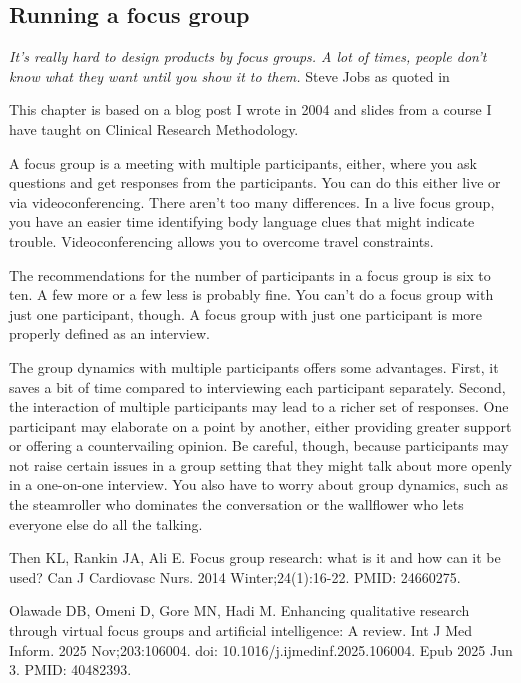 \documentclass[
  letterpaper,
  DIV=11,
  numbers=noendperiod]{scrreprt}
\begin{document}
\begin{tcolorbox}

\chapter{Running a focus group}\label{running-a-focus-group}

\emph{It's really hard to design products by focus groups. A lot of
times, people don't know what they want until you show it to them.}
Steve Jobs as quoted in

This chapter is based on a blog post I wrote in 2004 and slides from a
course I have taught on Clinical Research Methodology.

A focus group is a meeting with multiple participants, either, where you
ask questions and get responses from the participants. You can do this
either live or via videoconferencing. There aren't too many differences.
In a live focus group, you have an easier time identifying body language
clues that might indicate trouble. Videoconferencing allows you to
overcome travel constraints.

The recommendations for the number of participants in a focus group is
six to ten. A few more or a few less is probably fine. You can't do a
focus group with just one participant, though. A focus group with just
one participant is more properly defined as an interview.

The group dynamics with multiple participants offers some advantages.
First, it saves a bit of time compared to interviewing each participant
separately. Second, the interaction of multiple participants may lead to
a richer set of responses. One participant may elaborate on a point by
another, either providing greater support or offering a countervailing
opinion. Be careful, though, because participants may not raise certain
issues in a group setting that they might talk about more openly in a
one-on-one interview. You also have to worry about group dynamics, such
as the steamroller who dominates the conversation or the wallflower who
lets everyone else do all the talking.

Then KL, Rankin JA, Ali E. Focus group research: what is it and how can
it be used? Can J Cardiovasc Nurs. 2014 Winter;24(1):16-22. PMID:
24660275.

Olawade DB, Omeni D, Gore MN, Hadi M. Enhancing qualitative research
through virtual focus groups and artificial intelligence: A review. Int
J Med Inform. 2025 Nov;203:106004. doi: 10.1016/j.ijmedinf.2025.106004.
Epub 2025 Jun 3. PMID: 40482393.


\end{tcolorbox}
\end{document}
